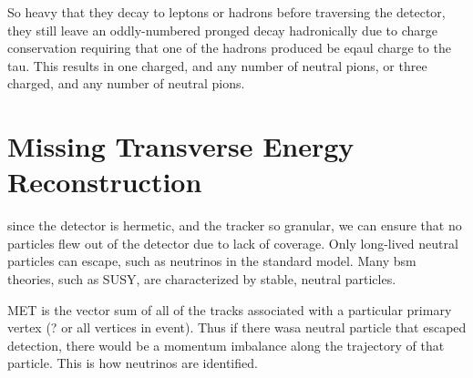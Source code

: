 \par So heavy that they decay to leptons or hadrons before traversing
the detector, they still leave an oddly-numbered pronged decay hadronically due
to charge conservation requiring that one of the hadrons produced be
eqaul charge to the tau.  This results in one charged, and any number
of neutral pions, or three charged, and any number of neutral pions. 

\section{Missing Transverse Energy Reconstruction}

\par since the detector is hermetic, and the tracker so granular, we
can ensure that no particles flew out of the detector due to lack of
coverage.  Only long-lived neutral particles can escape, such as
neutrinos in the standard model.  Many \acrshort{bsm} theories, such
as SUSY, are characterized by stable, neutral particles. 

\par MET is the vector sum of all of the tracks associated with a
particular primary vertex (? or all vertices in event).  Thus if there
wasa neutral particle that escaped detection, there would be a
momentum imbalance along the trajectory of that particle.  This is how
neutrinos are identified.  
